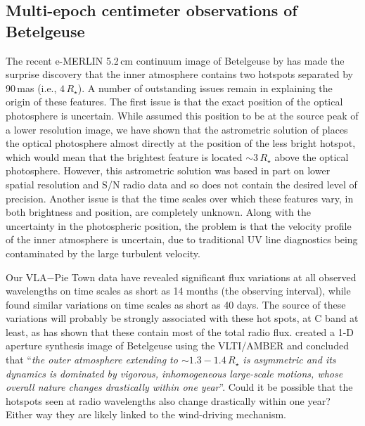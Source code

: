 \subsection{Multi-epoch centimeter observations of Betelgeuse}\label{sec:8.2.2}
The recent e-MERLIN 5.2\,cm continuum image of Betelgeuse by \cite{richards_2013} has made the surprise discovery that the inner atmosphere contains two hotspots separated by 90\,mas (i.e., $4\,R_{\star}$). A number of outstanding issues remain in explaining the origin of these features. The first issue is that the exact position of the optical photosphere is uncertain. While \cite{richards_2013} assumed this position to be at the source peak of a lower resolution image, we have shown that the astrometric solution of \cite{harper_2008} places the optical photosphere almost directly at the position of the less bright hotspot, which would mean that the brightest feature is located $\sim 3\,R_{\star}$ above the optical photosphere. However, this astrometric solution was based in part on lower spatial resolution and S/N radio data and so does not contain the desired level of precision. Another issue is that the time scales over which these features vary, in both brightness and position, are completely unknown.  Along with the uncertainty in the photospheric position, the problem is that the velocity profile of the inner atmosphere is uncertain, due to traditional UV line diagnostics being contaminated by the large turbulent velocity.

Our VLA$-$Pie Town data have revealed significant flux variations at all observed wavelengths on time scales as short as 14 months (the observing interval), while \cite{drake_1992} found similar variations on time scales as short as 40 days. The source of these variations will probably be strongly associated with these hot spots, at C band at least, as \cite{richards_2013} has shown that these contain most of the total radio flux. \cite{ohnaka_2011} created a 1-D aperture synthesis image of Betelgeuse using the VLTI/AMBER and concluded that  ``\textit{the outer atmosphere extending to $\mathit{\sim 1.3 - 1.4\,R_{\star}}$ is asymmetric and its dynamics is dominated by vigorous, inhomogeneous large-scale motions, whose overall nature changes drastically within one year}''. Could it be possible that the hotspots seen at radio wavelengths also  change drastically within one year? Either way they are likely linked to the wind-driving mechanism.

